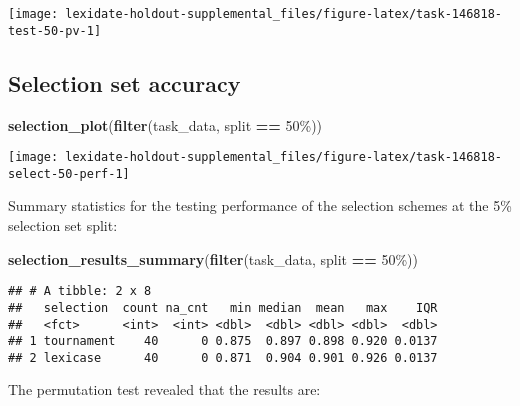 \documentclass[
]{book}
\newenvironment{Shaded}{\begin{snugshade}}{\end{snugshade}}
\newcommand{\FunctionTok}[1]{\textcolor[rgb]{0.13,0.29,0.53}{\textbf{#1}}}
\newcommand{\NormalTok}[1]{#1}
\newcommand{\SpecialCharTok}[1]{\textcolor[rgb]{0.81,0.36,0.00}{\textbf{#1}}}
\newcommand{\StringTok}[1]{\textcolor[rgb]{0.31,0.60,0.02}{#1}}
\begin{document}
\texttt{[image: lexidate-holdout-supplemental\_files/figure-latex/task-146818-test-50-pv-1]}

\hypertarget{selection-set-accuracy-2}{%
\subsection{Selection set accuracy}\label{selection-set-accuracy-2}}

\begin{Shaded}
\begin{Highlighting}[]
\FunctionTok{selection\_plot}\NormalTok{(}\FunctionTok{filter}\NormalTok{(task\_data, split }\SpecialCharTok{==} \StringTok{\textquotesingle{}50\%\textquotesingle{}}\NormalTok{))}
\end{Highlighting}
\end{Shaded}

\texttt{[image: lexidate-holdout-supplemental\_files/figure-latex/task-146818-select-50-perf-1]}

Summary statistics for the testing performance of the selection schemes at the 5\% selection set split:

\begin{Shaded}
\begin{Highlighting}[]
\FunctionTok{selection\_results\_summary}\NormalTok{(}\FunctionTok{filter}\NormalTok{(task\_data, split }\SpecialCharTok{==} \StringTok{\textquotesingle{}50\%\textquotesingle{}}\NormalTok{))}
\end{Highlighting}
\end{Shaded}

\begin{verbatim}
## # A tibble: 2 x 8
##   selection  count na_cnt   min median  mean   max    IQR
##   <fct>      <int>  <int> <dbl>  <dbl> <dbl> <dbl>  <dbl>
## 1 tournament    40      0 0.875  0.897 0.898 0.920 0.0137
## 2 lexicase      40      0 0.871  0.904 0.901 0.926 0.0137
\end{verbatim}

The permutation test revealed that the results are:
\end{document}
